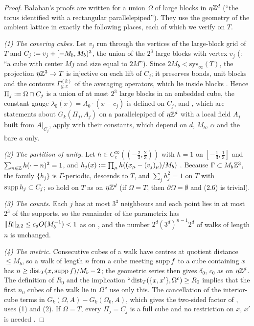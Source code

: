 \begin{proof}
Ba{\l}aban's proofs \cite[Sect.~2, pp.~574--586]{Ba4} are written for a union $\Omega$ of large blocks in $\eta\mathbb Z^d$ (``the torus identified with a rectangular parallelepiped''). They use the geometry of the ambient lattice in exactly the following places, each of which we verify on $T$.

\emph{(1) The covering cubes.} Let $v_j$ run through the vertices of the large-block grid of $T$ and $C_j:= v_j+[-M_b,M_b)^3$, the union of the $2^3$ large blocks with vertex $v_j$ (\cite[p.~578]{Ba4}: ``a cube with center $Mj$ and size equal to $2M$''). Since $2M_b<\mathrm{sys}_\infty(T)$, the projection $\eta\mathbb Z^3\to T$ is injective on each lift of $C_j$; it preserves bonds, unit blocks and the contours $\Gamma^{(k)}_{y,x}$ of the averaging operators, which lie inside blocks \cite[(1.4)]{Ba4}. Hence $\Pi_j:=\Omega\cap C_j$ is a union of at most $2^3$ large blocks in an embedded cube, the constant gauge $\lambda_0(x)=A_0\cdot(x-c_j)$ is defined on $C_j$, and \cite[Lemmas~2.1, 2.2, 2.4]{Ba4}, which are statements about $G_k(\Pi_j,A_j)$ on a parallelepiped of $\eta\mathbb Z^d$ with a local field $A_j$ built from $A|_{C_j}$, apply with their constants, which depend on $d$, $M_b$, $\alpha$ and the bare $a$ only.

\emph{(2) The partition of unity.} Let $h\in C^\infty_c((-\frac23,\frac23))$ with $h=1$ on $[-\frac13,\frac13]$ and $\sum_{n\in\mathbb Z}h(\cdot-n)^2=1$, and $h_j(x):=\prod_\mu h((x_\mu-(v_j)_\mu)/M_b)$ \cite[p.~575]{Ba4}. Because $\Gamma\subset M_b\mathbb Z^3$, the family $\{h_j\}$ is $\Gamma$-periodic, descends to $T$, and $\sum_jh_j^2=1$ on $T$ with $\operatorname{supp} h_j\subset C_j$; so \cite[(2.2)--(2.9)]{Ba4} hold on $T$ as on $\eta\mathbb Z^d$ (if $\Omega=T$, then $\partial\Omega=\emptyset$ and (2.6) is trivial).

\emph{(3) The counts.} Each $j$ has at most $3^3$ neighbours and each point lies in at most $2^3$ of the supports, so the remainder of the parametrix has $\lVert R\rVert_{2,2}\le c_dO(M_b^{-1})<1$ as on \cite[p.~577]{Ba4}, and the number $2^d(3^d)^{n-1}2^d$ of walks of length $n$ \cite[p.~579]{Ba4} is unchanged.

\emph{(4) The metric.} Consecutive cubes of a walk have centres at quotient distance $\le M_b$, so a walk of length $n$ from a cube meeting $\operatorname{supp} f$ to a cube containing $x$ has $n\ge\operatorname{dist}_T(x,\operatorname{supp} f)/M_b-2$; the geometric series \cite[(2.22)]{Ba4} then gives $\delta_0$, $c_0$ as on $\eta\mathbb Z^d$. The definition \cite[(2.19)]{Ba4} of $R_0$ and the implication ``$\operatorname{dist}_T(\{x,x'\},\Omega^c)\ge R_0$ implies that the first $n_0$ cubes of the walk lie in $\Omega$'' use only this. The cancellation of the interior-cube terms in $G_k(\Omega,A)-G_k(\Omega_0,A)$, which gives the two-sided factor of \cite[(2.26)]{Ba1}, uses (1) and (2). If $\Omega=T$, every $\Pi_j=C_j$ is a full cube and no restriction on $x$, $x'$ is needed \cite[p.~611]{Ba1}.


\end{proof}
